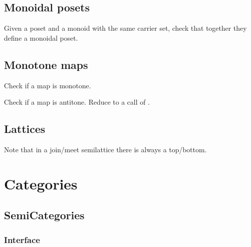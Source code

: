 \section{Monoidal posets}



\begin{exercise}
Given a poset and a monoid with the same carrier set, check that together they define a monoidal poset.

\end{exercise}


\section{Monotone maps}




\begin{exercise}
Check if a map is monotone.

\end{exercise}


\begin{exercise}
Check if a map is antitone. Reduce to a call of .

\end{exercise}


\section{Lattices}





Note that in a join/meet semilattice there is always a top/bottom.


\chapter{Categories}


\section{SemiCategories}
\subsection*{Interface}


